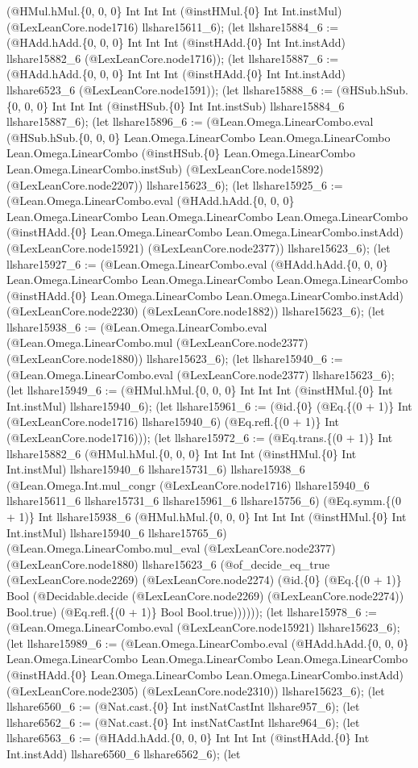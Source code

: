 \documentclass[11pt]{article}
\begin{document}
(@HMul.hMul.\{0, 0, 0\} Int Int Int (@instHMul.\{0\} Int Int.instMul) (@LexLeanCore.node1716) llshare15611\_6); (let llshare15884\_6 := (@HAdd.hAdd.\{0, 0, 0\} Int Int Int (@instHAdd.\{0\} Int Int.instAdd) llshare15882\_6 (@LexLeanCore.node1716)); (let llshare15887\_6 := (@HAdd.hAdd.\{0, 0, 0\} Int Int Int (@instHAdd.\{0\} Int Int.instAdd) llshare6523\_6 (@LexLeanCore.node1591)); (let llshare15888\_6 := (@HSub.hSub.\{0, 0, 0\} Int Int Int (@instHSub.\{0\} Int Int.instSub) llshare15884\_6 llshare15887\_6); (let llshare15896\_6 := (@Lean.Omega.LinearCombo.eval (@HSub.hSub.\{0, 0, 0\} Lean.Omega.LinearCombo Lean.Omega.LinearCombo Lean.Omega.LinearCombo (@instHSub.\{0\} Lean.Omega.LinearCombo Lean.Omega.LinearCombo.instSub) (@LexLeanCore.node15892) (@LexLeanCore.node2207)) llshare15623\_6); (let llshare15925\_6 := (@Lean.Omega.LinearCombo.eval (@HAdd.hAdd.\{0, 0, 0\} Lean.Omega.LinearCombo Lean.Omega.LinearCombo Lean.Omega.LinearCombo (@instHAdd.\{0\} Lean.Omega.LinearCombo Lean.Omega.LinearCombo.instAdd) (@LexLeanCore.node15921) (@LexLeanCore.node2377)) llshare15623\_6); (let llshare15927\_6 := (@Lean.Omega.LinearCombo.eval (@HAdd.hAdd.\{0, 0, 0\} Lean.Omega.LinearCombo Lean.Omega.LinearCombo Lean.Omega.LinearCombo (@instHAdd.\{0\} Lean.Omega.LinearCombo Lean.Omega.LinearCombo.instAdd) (@LexLeanCore.node2230) (@LexLeanCore.node1882)) llshare15623\_6); (let llshare15938\_6 := (@Lean.Omega.LinearCombo.eval (@Lean.Omega.LinearCombo.mul (@LexLeanCore.node2377) (@LexLeanCore.node1880)) llshare15623\_6); (let llshare15940\_6 := (@Lean.Omega.LinearCombo.eval (@LexLeanCore.node2377) llshare15623\_6); (let llshare15949\_6 := (@HMul.hMul.\{0, 0, 0\} Int Int Int (@instHMul.\{0\} Int Int.instMul) llshare15940\_6); (let llshare15961\_6 := (@id.\{0\} (@Eq.\{(0 + 1)\} Int (@LexLeanCore.node1716) llshare15940\_6) (@Eq.refl.\{(0 + 1)\} Int (@LexLeanCore.node1716))); (let llshare15972\_6 := (@Eq.trans.\{(0 + 1)\} Int llshare15882\_6 (@HMul.hMul.\{0, 0, 0\} Int Int Int (@instHMul.\{0\} Int Int.instMul) llshare15940\_6 llshare15731\_6) llshare15938\_6 (@Lean.Omega.Int.mul\_congr (@LexLeanCore.node1716) llshare15940\_6 llshare15611\_6 llshare15731\_6 llshare15961\_6 llshare15756\_6) (@Eq.symm.\{(0 + 1)\} Int llshare15938\_6 (@HMul.hMul.\{0, 0, 0\} Int Int Int (@instHMul.\{0\} Int Int.instMul) llshare15940\_6 llshare15765\_6) (@Lean.Omega.LinearCombo.mul\_eval (@LexLeanCore.node2377) (@LexLeanCore.node1880) llshare15623\_6 (@of\_decide\_eq\_true (@LexLeanCore.node2269) (@LexLeanCore.node2274) (@id.\{0\} (@Eq.\{(0 + 1)\} Bool (@Decidable.decide (@LexLeanCore.node2269) (@LexLeanCore.node2274)) Bool.true) (@Eq.refl.\{(0 + 1)\} Bool Bool.true)))))); (let llshare15978\_6 := (@Lean.Omega.LinearCombo.eval (@LexLeanCore.node15921) llshare15623\_6); (let llshare15989\_6 := (@Lean.Omega.LinearCombo.eval (@HAdd.hAdd.\{0, 0, 0\} Lean.Omega.LinearCombo Lean.Omega.LinearCombo Lean.Omega.LinearCombo (@instHAdd.\{0\} Lean.Omega.LinearCombo Lean.Omega.LinearCombo.instAdd) (@LexLeanCore.node2305) (@LexLeanCore.node2310)) llshare15623\_6); (let llshare6560\_6 := (@Nat.cast.\{0\} Int instNatCastInt llshare957\_6); (let llshare6562\_6 := (@Nat.cast.\{0\} Int instNatCastInt llshare964\_6); (let llshare6563\_6 := (@HAdd.hAdd.\{0, 0, 0\} Int Int Int (@instHAdd.\{0\} Int Int.instAdd) llshare6560\_6 llshare6562\_6); (let 
\end{document}
